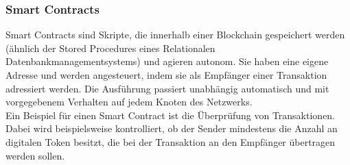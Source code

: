     \subsubsection{Smart Contracts}
    \label{sec:sota_blockchain_sc}
        Smart Contracts sind Skripte, die innerhalb einer Blockchain gespeichert werden (ähnlich der Stored Procedures eines Relationalen Datenbankmanagementsystems) und agieren autonom. 
        Sie haben eine eigene Adresse und werden angesteuert, indem sie als Empfänger einer Transaktion adressiert werden.
        Die Ausführung passiert unabhängig automatisch und mit vorgegebenem Verhalten auf jedem Knoten des Netzwerks. \cite{Christidis2016}
        \smallskip\\
        Ein Beispiel für einen Smart Contract ist die Überprüfung von Transaktionen. 
        Dabei wird beispielsweise kontrolliert, ob der Sender mindestens die Anzahl an digitalen Token besitzt, die bei der Transaktion an den Empfänger übertragen werden sollen.
    

